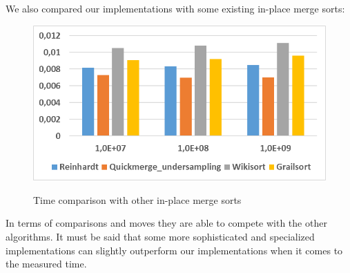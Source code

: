 \documentclass[11pt,pdftex,a4paper, twocolumn]{article}
\begin{document}
We also compared our implementations with some existing in-place merge sorts: \\
\begin{figure}[H]
\includegraphics[width=\linewidth]{Diagramm-Bilder/time-other-inplace.JPG} \\
\caption{Time comparison with other in-place merge sorts} \label{fig:time-other-inplace}
\end{figure}
In terms of comparisons and moves they are able to compete with the other algorithms. It must be said that some more sophisticated and specialized implementations can slightly outperform our implementations when it comes to the measured time.

\nocite{wegener1993bottom}
\nocite{edelkamp2019worst}


\end{document}
